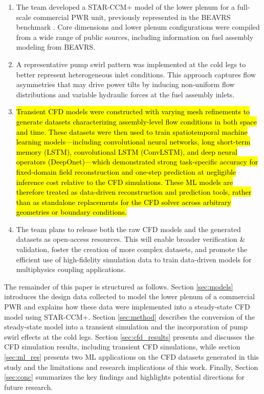 \documentclass[review]{elsarticle}
\theoremstyle{definition}
\theoremstyle{definition}
\theoremstyle{remark}
\begin{document}
\begin{enumerate}
    
    \item The team developed a STAR-CCM+ model of the lower plenum for a full-scale commercial PWR unit, previously represented in the BEAVRS benchmark \cite{horelik2013benchmark}. Core dimensions and lower plenum configurations were compiled from a wide range of public sources, including information on fuel assembly modeling from BEAVRS.
    
    \item A representative pump swirl pattern was implemented at the cold legs to better represent heterogeneous inlet conditions. This approach captures flow asymmetries that may drive power tilts by inducing non-uniform flow distributions and variable hydraulic forces at the fuel assembly inlets.
    
    \item \hl{Transient CFD models were constructed with varying mesh refinements to generate datasets characterizing assembly-level flow conditions in both space and time. These datasets were then used to train spatiotemporal machine learning models—including convolutional neural networks, long short-term memory (LSTM), convolutional LSTM (ConvLSTM), and deep neural operators (DeepOnet)—which demonstrated strong task-specific accuracy for fixed-domain field reconstruction and one-step prediction at negligible inference cost relative to the CFD simulations. These ML models are therefore treated as data-driven reconstruction and prediction tools, rather than as standalone replacements for the CFD solver across arbitrary geometries or boundary conditions.}
    
    \item The team plans to release both the raw CFD models and the generated datasets as open-access resources. This will enable broader verification \& validation, foster the creation of more complex datasets, and promote the efficient use of high-fidelity simulation data to train data-driven models for multiphysics coupling applications.
\end{enumerate}

The remainder of this paper is structured as follows. Section \ref{sec:models} introduces the design data collected to model the lower plenum of a commercial PWR and explains how these data were implemented into a steady-state CFD model using STAR-CCM+. Section \ref{sec:method} describes the conversion of the steady-state model into a transient simulation and the incorporation of pump swirl effects at the cold legs. Section \ref{sec:cfd_results} presents and discusses the CFD simulation results, including transient CFD simulations, while section \ref{sec:ml_res} presents two ML applications on the CFD datasets generated in this study and the limitations and research implications of this work. Finally, Section \ref{sec:conc} summarizes the key findings and highlights potential directions for future research.
\end{document}
